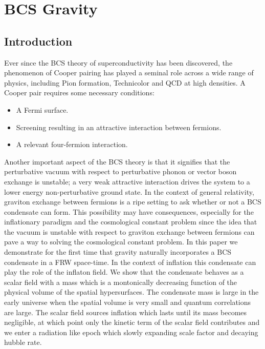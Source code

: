 \chapter{BCS Gravity}

\begin{doublespace}

\section{Introduction}

Ever since the BCS theory of superconductivity has been discovered, the phenomenon of Cooper
pairing has played a seminal role across a wide range of physics, including Pion formation,
Technicolor and QCD at high densities.  A Cooper pair requires some necessary conditions:
\begin{itemize}
\item A Fermi surface. \item Screening resulting in an attractive interaction between fermions.
\item A relevant four-fermion interaction.
\end{itemize}

Another important aspect of the BCS theory is that it signifies that the perturbative vacuum with
respect to perturbative phonon or vector boson exchange is unstable; a very weak attractive
interaction drives the system to a lower energy non-perturbative ground state. In the context of
general relativity, graviton exchange between fermions is a ripe setting to ask whether or not a
BCS condensate can form. This possibility may have consequences, especially for the inflationary
paradigm and the cosmological constant problem since the idea that the vacuum is unstable with
respect to graviton exchange between fermions can pave a way to solving the cosmological constant
problem.  In this paper we demonstrate for the first time that gravity naturally incorporates a
BCS condensate in a %
FRW space-time. In the context of inflation this condensate can play the role of the inflaton
field. We show that the condensate behaves as a scalar field with a mass which is a montonically
decreasing function of the physical volume of the spatial hypersurfaces. The condensate mass is
large in the early universe when the spatial volume is very small and quantum correlations are
large. The scalar field sources inflation which lasts until its mass becomes negligible, at which
point only the kinetic term of the scalar field contributes and we enter a radiation like epoch
which slowly expanding scale factor and decaying hubble rate.


\end{doublespace}
